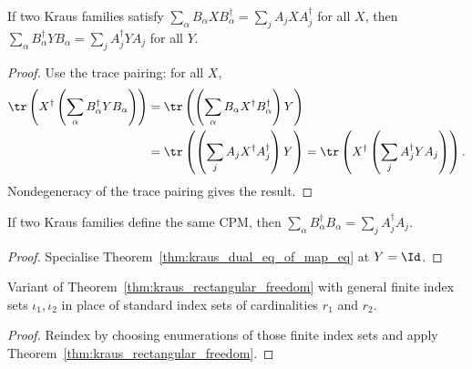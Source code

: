 \begin{theorem}\label{thm:kraus_dual_eq_of_map_eq}
    \leanok
    If two Kraus families satisfy
    $\sum_\alpha B_\alpha X B_\alpha^\dagger = \sum_j A_j X A_j^\dagger$
    for all $X$, then
    $\sum_\alpha B_\alpha^\dagger Y B_\alpha = \sum_j A_j^\dagger Y A_j$
    for all $Y$.
\end{theorem}

\begin{proof}
    \leanok
    Use the trace pairing: for all $X$,
    \begin{align}
        \tr\left(X^\dagger
            \left(\sum_\alpha B_\alpha^\dagger Y B_\alpha\right)\right)
        &= \tr\left(\left(\sum_\alpha
            B_\alpha X^\dagger B_\alpha^\dagger\right)Y\right)
        \notag\\
        &= \tr\left(\left(\sum_j
            A_j X^\dagger A_j^\dagger\right)Y\right)
         = \tr\left(X^\dagger
            \left(\sum_j A_j^\dagger Y A_j\right)\right).
        \notag
    \end{align}
    Nondegeneracy of the trace pairing gives the result.
\end{proof}

\begin{theorem}\label{thm:kraus_conjTranspose_mul_eq_of_map_eq}
    \leanok
    If two Kraus families define the same CPM, then
    $\sum_\alpha B_\alpha^\dagger B_\alpha = \sum_j A_j^\dagger A_j$.
\end{theorem}

\begin{proof}
    \leanok
    Specialise Theorem~\ref{thm:kraus_dual_eq_of_map_eq} at $Y = \Id$.
\end{proof}

\begin{theorem}\label{thm:kraus_rectangular_freedom'}
    \leanok
    Variant of Theorem~\ref{thm:kraus_rectangular_freedom} with general
    finite index sets $\iota_1, \iota_2$ in place of standard index sets of
    cardinalities $r_1$ and $r_2$.
\end{theorem}

\begin{proof}
    \leanok
    Reindex by choosing enumerations of those finite index sets and apply
    Theorem~\ref{thm:kraus_rectangular_freedom}.
\end{proof}

